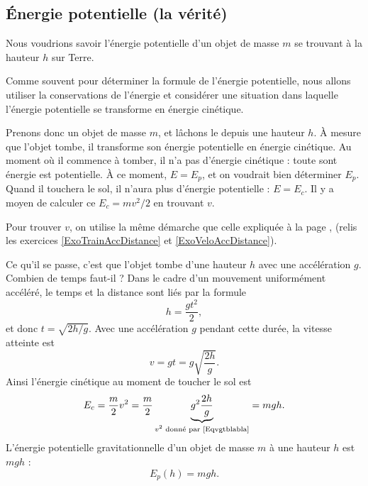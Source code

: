 \documentclass[a4paper,12pt]{book}
\theoremstyle{mes_exemples}	\newtheorem{exemple}[numtho]{Exemple}
\theoremstyle{mes_tho}
\begin{document}
\subsection{Énergie potentielle (la vérité)}

Nous voudrions savoir l'énergie potentielle d'un objet de masse $m$ se trouvant à la hauteur $h$ sur Terre.

\begin{idee}
Comme souvent pour déterminer la formule de l'énergie potentielle, nous allons utiliser la conservations  de l'énergie et considérer une situation dans laquelle l'énergie potentielle se transforme en énergie cinétique. 
\end{idee}


Prenons donc un objet de masse $m$, et lâchons le depuis une hauteur $h$. À mesure que l'objet tombe, il transforme son énergie potentielle en énergie cinétique. Au moment où il commence à tomber, il n'a pas d'énergie cinétique : toute sont énergie est potentielle. À ce moment, $E=E_p$, et on voudrait bien déterminer $E_p$. Quand il touchera le sol, il n'aura plus d'énergie potentielle : $E=E_c$. Il y a moyen de calculer ce $E_c=mv^2/2$ en trouvant $v$.

Pour trouver $v$, on utilise la même démarche que celle expliquée à la page \pageref{PgPourquoiAccDeDistance}, (relis les exercices \ref{ExoTrainAccDistance} et \ref{ExoVeloAccDistance}).

Ce qu'il se passe, c'est que l'objet tombe d'une hauteur $h$ avec une accélération $g$. Combien de temps faut-il ? Dans le cadre d'un mouvement uniformément accéléré, le temps et la distance sont liés par la formule
\[
  h=\frac{gt^2}{2},
\]
et donc $t=\sqrt{2h/g}$. Avec une accélération $g$ pendant cette durée, la vitesse atteinte est 
\begin{equation}		\label{Eqvgtblabla}
	v=gt=g\sqrt{\frac{2h}{g}}.
\end{equation}
Ainsi l'énergie cinétique au moment de toucher le sol est
\[
E_c=\frac{ m }{ 2 }v^2=\frac{m}{2}\underbrace{ g^2\frac{2h}{g}}_{\text{$v^2$ donné par \eqref{Eqvgtblabla}}}=mgh.
\]
L'énergie potentielle gravitationnelle d'un objet de masse $m$ à une hauteur $h$ est $mgh$ :
\begin{equation}
	E_p(h)=mgh.
\end{equation}
\end{document}
